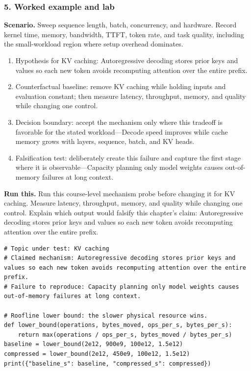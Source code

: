 \subsubsection*{5. Worked example and lab}
\textbf{Scenario.} Sweep sequence length, batch, concurrency, and hardware. Record kernel time, memory, bandwidth, TTFT, token rate, and task quality, including the small-workload region where setup overhead dominates.
\begin{enumerate}
\item Hypothesis for KV caching: Autoregressive decoding stores prior keys and values so each new token avoids recomputing attention over the entire prefix.
\item Counterfactual baseline: remove KV caching while holding inputs and evaluation constant; then measure latency, throughput, memory, and quality while changing one control.
\item Decision boundary: accept the mechanism only where this tradeoff is favorable for the stated workload—Decode speed improves while cache memory grows with layers, sequence, batch, and KV heads.
\item Falsification test: deliberately create this failure and capture the first stage where it is observable—Capacity planning only model weights causes out-of-memory failures at long context.
\end{enumerate}
\textbf{Run this.} Run this course-level mechanism probe before changing it for KV caching. Measure latency, throughput, memory, and quality while changing one control. Explain which output would falsify this chapter's claim: Autoregressive decoding stores prior keys and values so each new token avoids recomputing attention over the entire prefix.
\begin{Verbatim}[fontsize=\scriptsize]
# Topic under test: KV caching
# Claimed mechanism: Autoregressive decoding stores prior keys and values so each new token avoids recomputing attention over the entire prefix.
# Failure to reproduce: Capacity planning only model weights causes out-of-memory failures at long context.

# Roofline lower bound: the slower physical resource wins.
def lower_bound(operations, bytes_moved, ops_per_s, bytes_per_s):
    return max(operations / ops_per_s, bytes_moved / bytes_per_s)
baseline = lower_bound(2e12, 900e9, 100e12, 1.5e12)
compressed = lower_bound(2e12, 450e9, 100e12, 1.5e12)
print({"baseline_s": baseline, "compressed_s": compressed})
\end{Verbatim}

